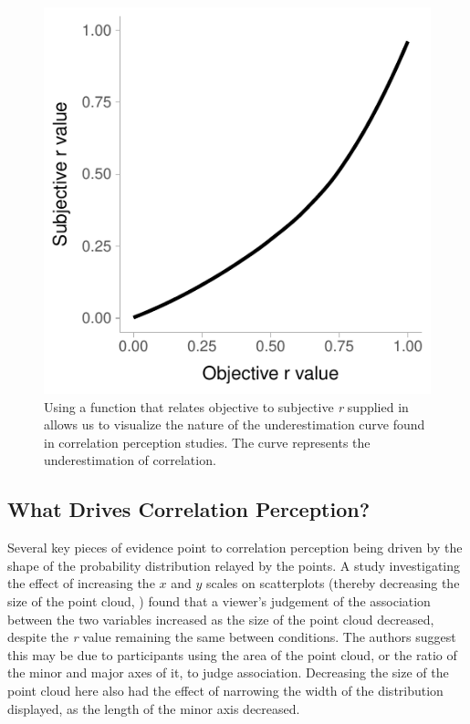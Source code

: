 \documentclass[preprint, 3p,
authoryear]{elsarticle} %
\begin{document}
\begin{figure}

\includegraphics{contrast_and_scatterplots_files/figure-latex/underestimation-curve-1} \hfill{}

\caption{\label{underestimation-curve}Using a function that relates objective to subjective \textit{r} supplied in \cite{rensink_2017} allows us to visualize the nature of the underestimation curve found in correlation perception studies. The curve represents the underestimation of correlation.}\label{fig:underestimation-curve}
\end{figure}

\hypertarget{what-drives-correlation-perception}{%
\subsection{What Drives Correlation
Perception?}\label{what-drives-correlation-perception}}

Several key pieces of evidence point to correlation perception being
driven by the shape of the probability distribution relayed by the
points. A study investigating the effect of increasing the \(x\) and
\(y\) scales on scatterplots (thereby decreasing the size of the point
cloud, \citealp{cleveland_1982}) found that a viewer's judgement of the
association between the two variables increased as the size of the point
cloud decreased, despite the \emph{r} value remaining the same between
conditions. The authors suggest this may be due to participants using
the area of the point cloud, or the ratio of the minor and major axes of
it, to judge association. Decreasing the size of the point cloud here
also had the effect of narrowing the width of the distribution
displayed, as the length of the minor axis decreased.
\end{document}
